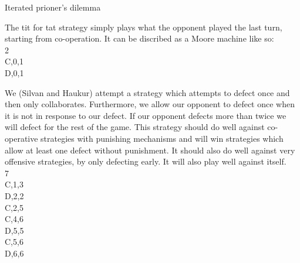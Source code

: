 \documentclass[12pt]{article}
\newenvironment{question}[2][Question]{\begin{trivlist}
\item[\hskip \labelsep {\bfseries #1}\hskip \labelsep {\bfseries #2.}]}{\end{trivlist}}
\newenvironment{answer}[2][Answer]{\begin{trivlist}
\item[\hskip \labelsep {\bfseries #1}\hskip \labelsep {\bfseries #2:}]}{\end{trivlist}}
\begin{document}
\begin{question}{4}
Iterated prioner's dilemma
\end{question}
\begin{answer}{a)}
The tit for tat strategy simply plays what the opponent played the last turn, starting from co-operation. It can be discribed as a Moore machine like so: \\
2 \\
C,0,1 \\
D,0,1 \\
\end{answer}
\begin{answer}{b)}
We (Silvan and Haukur) attempt a strategy which attempts to defect once and then only collaborates. Furthermore, we allow our opponent to defect once when it is not in response to our defect. If our opponent defects more than twice we will defect for the rest of the game. This strategy should do well against co-operative strategies with punishing mechanisms and will win strategies which allow at least one defect without punishment. It should also do well against very offensive strategies, by only defecting early. It will also play well against itself. \\
7 \\
C,1,3 \\
D,2,2 \\
C,2,5 \\
C,4,6 \\
D,5,5 \\
C,5,6 \\
D,6,6
\end{answer}
\end{document}
